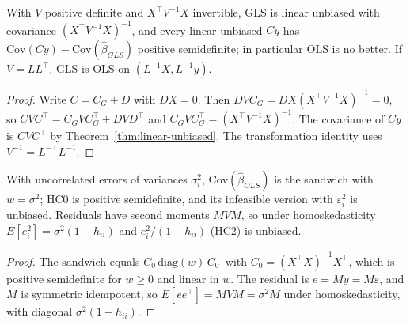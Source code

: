 \begin{theorem}[Aitken]
\label{thm:aitken}
\leanok
{}
With $V$ positive definite and $X^\top V^{-1}X$ invertible, GLS is linear unbiased with covariance
$(X^\top V^{-1}X)^{-1}$, and every linear unbiased $Cy$ has $\mathrm{Cov}(Cy) - \mathrm{Cov}(\hat\beta_{GLS})$
positive semidefinite; in particular OLS is no better. If $V = LL^\top$, GLS is OLS on $(L^{-1}X, L^{-1}y)$.
\end{theorem}
\begin{proof}
\leanok
Write $C = C_G + D$ with $DX = 0$. Then $DVC_G^\top = DX(X^\top V^{-1}X)^{-1} = 0$, so
$CVC^\top = C_GVC_G^\top + DVD^\top$ and $C_GVC_G^\top = (X^\top V^{-1}X)^{-1}$. The covariance of $Cy$ is $CVC^\top$
by Theorem~\ref{thm:linear-unbiased}. The transformation identity uses $V^{-1} = L^{-\top}L^{-1}$.
\end{proof}

\begin{theorem}
\label{thm:robust-se}
\leanok
{}
With uncorrelated errors of variances $\sigma_i^2$, $\mathrm{Cov}(\hat\beta_{OLS})$ is the sandwich with $w = \sigma^2$;
HC0 is positive semidefinite, and its infeasible version with $\varepsilon_i^2$ is unbiased. Residuals have second
moments $MVM$, so under homoskedasticity $E[e_i^2] = \sigma^2(1-h_{ii})$ and $e_i^2/(1-h_{ii})$ (HC2) is unbiased.
\end{theorem}
\begin{proof}
\leanok
The sandwich equals $C_0\,\mathrm{diag}(w)\,C_0^\top$ with $C_0 = (X^\top X)^{-1}X^\top$, which is positive semidefinite
for $w\ge 0$ and linear in $w$. The residual is $e = My = M\varepsilon$, and $M$ is symmetric idempotent, so
$E[ee^\top] = MVM = \sigma^2 M$ under homoskedasticity, with diagonal $\sigma^2(1-h_{ii})$.
\end{proof}

